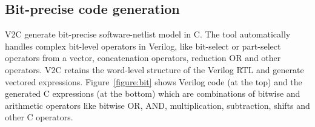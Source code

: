 \subsection{Bit-precise code generation}


V2C generate bit-precise software-netlist model in C.
The tool automatically handles complex bit-level operators in Verilog, 
like bit-select or part-select operators from a vector,
concatenation operators, reduction OR and other operators. V2C retains 
the word-level structure of the Verilog RTL and generate 
vectored expressions. Figure~\ref{figure:bit} shows 
Verilog code (at the top) and the generated C expressions 
(at the bottom) which are combinations of bitwise and 
arithmetic operators like bitwise OR, AND, multiplication, 
subtraction, shifts and other C operators.     
%
%
